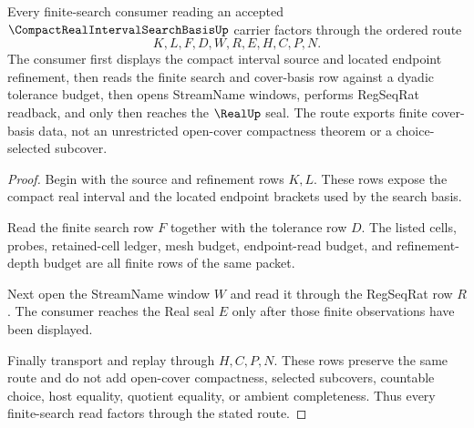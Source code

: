 \begin{theorem}
\label{thm:compact-real-interval-search-basis-finite-cover-route}
Every finite-search consumer reading an accepted $\CompactRealIntervalSearchBasisUp$ carrier factors through the ordered route
$$
K,L,F,D,W,R,E,H,C,P,N .
$$
The consumer first displays the compact interval source and located endpoint refinement, then reads the finite search and cover-basis row against a dyadic tolerance budget, then opens StreamName windows, performs RegSeqRat readback, and only then reaches the $\RealUp$ seal. The route exports finite cover-basis data, not an unrestricted open-cover compactness theorem or a choice-selected subcover.
\end{theorem}
\begin{proof}
Begin with the source and refinement rows $K,L$. These rows expose the compact real interval and the located endpoint brackets used by the search basis.

Read the finite search row $F$ together with the tolerance row $D$. The listed cells, probes, retained-cell ledger, mesh budget, endpoint-read budget, and refinement-depth budget are all finite rows of the same packet.

Next open the StreamName window $W$ and read it through the RegSeqRat row $R$. The consumer reaches the Real seal $E$ only after those finite observations have been displayed.

Finally transport and replay through $H,C,P,N$. These rows preserve the same route and do not add open-cover compactness, selected subcovers, countable choice, host equality, quotient equality, or ambient completeness. Thus every finite-search read factors through the stated route.
\end{proof}

